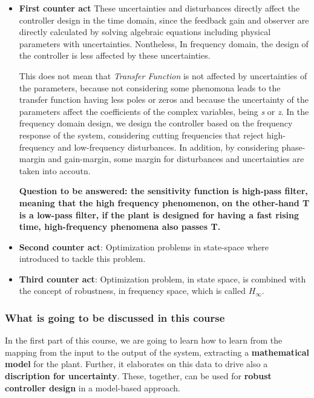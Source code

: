 \begin{itemize}
    \item \textbf{First counter act}  These uncertainties and disturbances directly affect the controller design in the time domain, since the feedback gain and observer are directly calculated by solving algebraic equations including physical parameters with uncertainties. Nontheless, In frequency domain, the design of the controller is less affected by these uncertainties. 

    This does not mean that \textit{Transfer Function} is not affected by uncertainties of the parameters, because not considering some phenomona leads to the transfer function having less poles or zeros and because the uncertainty of the parameters affect the coefficients of the complex variables, being \textit{s} or \textit{z}. In the frequency domain design, we design the controller based on the frequency response of the system, considering cutting frequencies that reject high-frequency and low-frequency disturbances. In addition, by considering phase-margin and gain-margin, some margin for disturbances and uncertainties are taken into accoutn.

\textbf{Question to be answered: the sensitivity function is high-pass filter, meaning that the high frequency phenomenon, on the other-hand T is a low-pass filter, if the plant is designed for having a fast rising time, high-frequency phenomena also passes T.}

    \item \textbf{Second counter act}: Optimization problems in state-space where introduced to tackle this problem.
    \item \textbf{Third counter act}: Optimization problem, in state space, is combined with the concept of robustness, in frequency space, which is called $H_{\infty}$. 
\end{itemize}


\subsubsection{What is going to be discussed in this course}
    In the first part of this course, we are going to learn how to learn from the mapping from the input to the output of the system, extracting a \textbf{mathematical model} for the plant. Further, it elaborates on this data to drive also a \textbf{discription for uncertainty}. These, together, can be used for \textbf{robust controller design} in a model-based approach.

